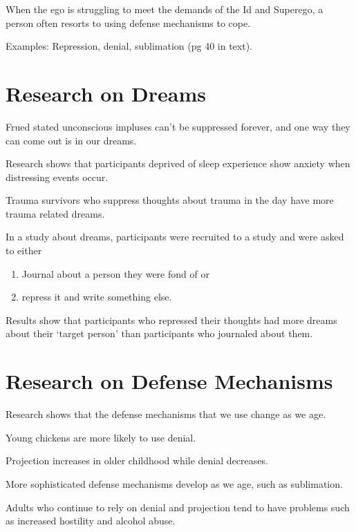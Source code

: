\begin{coloredlist}
    \item When the ego is struggling to meet the demands of the Id and Superego, a person often resorts to using defense mechanisms to cope.
    \item Examples: Repression, denial, sublimation (pg 40 in text).
\end{coloredlist}

\section{Research on Dreams}

\begin{coloredlist}
    \item Frued stated unconscious impluses can't be suppressed forever, and one way they can come out is in our dreams.
    \item Research shows that participants deprived of sleep experience show anxiety when distressing events occur.
    \item Trauma survivors who suppress thoughts about trauma in the day have more trauma related dreams.
    \item In a study about dreams, participants were recruited to a study and were asked to either 
    \begin{enumerate}
        \item Journal about a person they were fond of or
        \item repress it and write something else.
    \end{enumerate}
    \item Results show that participants who repressed their thoughts had more dreams about their `target person' than participants who journaled about them.
\end{coloredlist}

\section{Research on Defense Mechanisms}

\begin{coloredlist}
    \item Research shows that the defense mechanisms that we use change as we age.
    \item Young chickens are more likely to use denial.
    \item Projection increases in older childhood while denial decreases. 
    \item More sophisticated defense mechanisms develop as we age, such as sublimation.
    \item Adults who continue to rely on denial and projection tend to have problems such as increased hostility and alcohol abuse.
\end{coloredlist}

